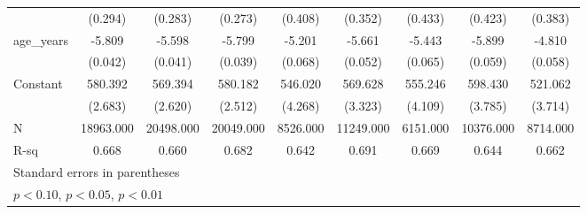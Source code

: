 \begin{table}[htbp]
\begin{tabular}{l*{8}{c}}
                    &     (0.294)         &     (0.283)         &     (0.273)         &     (0.408)         &     (0.352)         &     (0.433)         &     (0.423)         &     (0.383)         \\
[1em]
age\_years           &      -5.809\sym{***}&      -5.598\sym{***}&      -5.799\sym{***}&      -5.201\sym{***}&      -5.661\sym{***}&      -5.443\sym{***}&      -5.899\sym{***}&      -4.810\sym{***}\\
                    &     (0.042)         &     (0.041)         &     (0.039)         &     (0.068)         &     (0.052)         &     (0.065)         &     (0.059)         &     (0.058)         \\
[1em]
Constant            &     580.392\sym{***}&     569.394\sym{***}&     580.182\sym{***}&     546.020\sym{***}&     569.628\sym{***}&     555.246\sym{***}&     598.430\sym{***}&     521.062\sym{***}\\
                    &     (2.683)         &     (2.620)         &     (2.512)         &     (4.268)         &     (3.323)         &     (4.109)         &     (3.785)         &     (3.714)         \\
\hline
N                   &   18963.000         &   20498.000         &   20049.000         &    8526.000         &   11249.000         &    6151.000         &   10376.000         &    8714.000         \\
R-sq                &       0.668         &       0.660         &       0.682         &       0.642         &       0.691         &       0.669         &       0.644         &       0.662         \\
\hline\hline
\multicolumn{9}{l}{\footnotesize Standard errors in parentheses}\\
\multicolumn{9}{l}{\footnotesize \sym{*} \(p<0.10\), \sym{**} \(p<0.05\), \sym{***} \(p<0.01\)}\\
\end{tabular}
\end{table}
